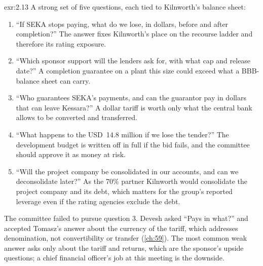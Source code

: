 \begin{solution}{exr:2.13}
A strong set of five questions, each tied to Kilnworth's balance sheet:
\begin{enumerate}
\item ``If SEKA stops paying, what do we lose, in dollars, before and after completion?'' The answer fixes Kilnworth's place on the recourse ladder and therefore its rating exposure.
\item ``Which sponsor support will the lenders ask for, with what cap and release date?'' A completion guarantee on a plant this size could exceed what a BBB- balance sheet can carry.
\item ``Who guarantees SEKA's payments, and can the guarantor pay in dollars that can leave Kessara?'' A dollar tariff is worth only what the central bank allows to be converted and transferred.
\item ``What happens to the USD~14.8 million if we lose the tender?'' The development budget is written off in full if the bid fails, and the committee should approve it as money at risk.
\item ``Will the project company be consolidated in our accounts, and can we deconsolidate later?'' As the 70\% partner Kilnworth would consolidate the project company and its debt, which matters for the group's reported leverage even if the rating agencies exclude the debt.
\end{enumerate}
The committee failed to pursue question 3. Devesh asked ``Pays in what?'' and accepted Tomasz's answer about the currency of the tariff, which addresses denomination, not convertibility or transfer (\cref{ch:59}). The most common weak answer asks only about the tariff and returns, which are the sponsor's upside questions; a chief financial officer's job at this meeting is the downside.
\end{solution}

